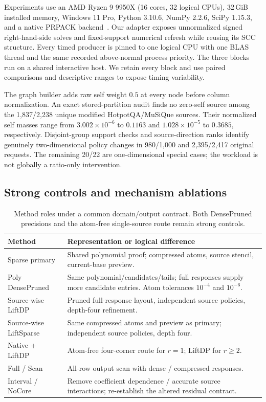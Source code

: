 \documentclass[conference]{IEEEtran}
\begin{document}
Experiments use an AMD Ryzen 9 9950X (16 cores, 32 logical CPUs), 32\,GiB installed memory, Windows 11 Pro, Python 3.10.6, NumPy 2.2.6, SciPy 1.15.3, and a native PRPACK backend~\cite{prpack}. Our adapter exposes unnormalized signed right-hand-side solves and fixed-support numerical refresh while reusing its SCC structure. Every timed producer is pinned to one logical CPU with one BLAS thread and the same recorded above-normal process priority. The three blocks run on a shared interactive host. We retain every block and use paired comparisons and descriptive ranges to expose timing variability.

The graph builder adds raw self weight $0.5$ at every node before column normalization. An exact stored-partition audit finds no zero-self source among the 1,837/2,238 unique modified HotpotQA/MuSiQue sources. Their normalized self masses range from $3.002\times10^{-6}$ to $0.1163$ and $1.028\times10^{-5}$ to $0.3685$, respectively. Disjoint-group support checks and source-direction ranks identify genuinely two-dimensional policy changes in 980/1,000 and 2,395/2,417 original requests. The remaining 20/22 are one-dimensional special cases; the workload is not globally a ratio-only intervention.

\subsection{Strong controls and mechanism ablations}
\begin{table}[t]
\centering\small
\caption{Method roles under a common domain/output contract. Both DensePruned precisions and the atom-free single-source route remain strong controls.}
\label{tab:methods}
\begin{tabular}{@{}p{}p{}@{}}
\toprule
Method & Representation or logical difference\\
\midrule
Sparse primary & Shared polynomial proof; compressed atoms, source stencil, current-base preview.\\
Poly DensePruned & Same polynomial/candidates/tails; full responses supply more candidate entries. Atom tolerances $10^{-4}$ and $10^{-6}$.\\
Source-wise LiftDP & Pruned full-response layout, independent source policies, depth-four refinement.\\
Source-wise LiftSparse & Same compressed atoms and preview as primary; independent source policies, depth four.\\
Native + LiftDP & Atom-free four-corner route for $r=1$; LiftDP for $r\geq2$.\\
Full / Scan & All-row output scan with dense / compressed responses.\\
Interval / NoCore & Remove coefficient dependence / accurate source interactions; re-establish the altered residual contract.\\
\bottomrule
\end{tabular}
\end{table}
\end{document}
